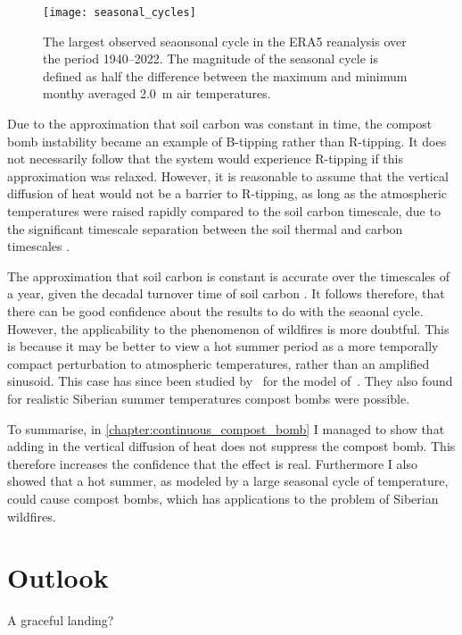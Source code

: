 \begin{figure}
  \centering
  \texttt{[image: seasonal\_cycles]}
  \caption[Map of Seasonal Cycles]{The largest observed seaonsonal cycle in the ERA5 reanalysis \parencite{Hersback2020} over the period 1940--2022.
    The magnitude of the seasonal cycle is defined as half the difference between the maximum and minimum monthy averaged \SI{2.0}{\meter} air temperatures.}
  \label{fig:seasonal_cycle_maps}
\end{figure}


Due to the approximation that soil carbon was constant in time, the compost bomb instability became an example of B-tipping rather than R-tipping. It does not necessarily
follow that the system would experience R-tipping if this approximation was relaxed. However, it is reasonable to assume that the vertical diffusion of heat would not be a barrier to
R-tipping, as long as the atmospheric temperatures were raised rapidly compared to the soil carbon timescale, due to the significant timescale separation between the soil thermal and
carbon timescales \parencite{Luke2011}.

The approximation that soil carbon is constant is accurate over the timescales of a year, given the decadal turnover time of soil carbon \parencite{Varney2020}.
It follows therefore, that there can be good confidence about the results to do with the seaonal cycle. However, the applicability to the phenomenon of wildfires is more doubtful.
This is because it may be better to view a hot summer period as a more temporally compact perturbation to atmospheric temperatures, rather than an amplified sinusoid. This case has
since been studied by~\cite{OSullivan2023} for the model of~\cite{Luke2011}. They also found for realistic Siberian summer temperatures compost bombs were possible. 

To summarise, in \cref{chapter:continuous_compost_bomb} I managed to show that adding in the vertical diffusion of heat does not suppress the compost bomb. This therefore increases the confidence
that the effect is real. Furthermore I also showed that a hot summer, as modeled by a large seasonal cycle of temperature, could cause compost bombs, which has applications to the
problem of Siberian wildfires.
\section{Outlook}

A graceful landing?